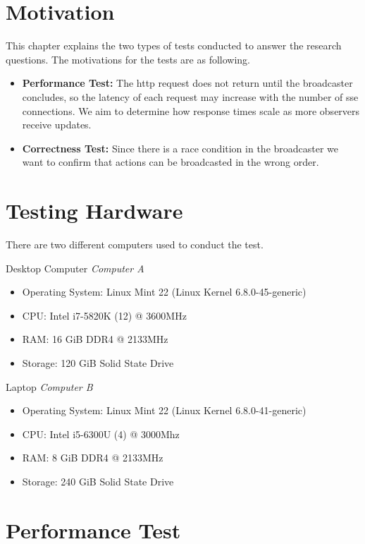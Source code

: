 \documentclass[final,oneside]{vutinfth}
\begin{document}
\section{Motivation}

This chapter explains the two types of tests conducted to answer the research questions.
The motivations for the tests are as following.

\begin{itemize}
    \item \textbf{Performance Test:} The \gls{http} request does not return until the broadcaster concludes, so the latency of each request may increase with the number of \gls{sse} connections.
    We aim to determine how response times scale as more observers receive updates.
    \item \textbf{Correctness Test:} Since there is a race condition in the broadcaster we want to confirm that actions can be broadcasted in the wrong order. 
\end{itemize}

\section{Testing Hardware}

There are two different computers used to conduct the test.

Desktop Computer \textit{Computer A}
\begin{itemize}
  \item Operating System: Linux Mint 22 (Linux Kernel 6.8.0-45-generic)
  \item CPU: Intel i7-5820K (12) @ 3600MHz
  \item RAM: 16 GiB DDR4 @ 2133MHz
  \item Storage: 120 GiB Solid State Drive
\end{itemize}

Laptop \textit{Computer B}
\begin{itemize}
  \item Operating System: Linux Mint 22 (Linux Kernel 6.8.0-41-generic)
  \item CPU: Intel i5-6300U (4) @ 3000Mhz
  \item RAM: 8 GiB DDR4 @ 2133MHz
  \item Storage: 240 GiB Solid State Drive
\end{itemize}

\section{Performance Test}
\end{document}
